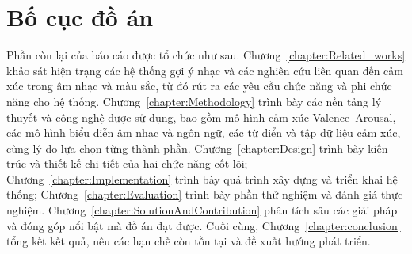 \documentclass[../DoAn.tex]{subfiles}
\begin{document}
\section{Bố cục đồ án}
\label{section:1.4}
Phần còn lại của báo cáo được tổ chức như sau. Chương~\ref{chapter:Related_works} khảo sát hiện trạng các hệ thống gợi ý nhạc và các nghiên cứu liên quan đến cảm xúc trong âm nhạc và màu sắc, từ đó rút ra các yêu cầu chức năng và phi chức năng cho hệ thống. Chương~\ref{chapter:Methodology} trình bày các nền tảng lý thuyết và công nghệ được sử dụng, bao gồm mô hình cảm xúc Valence--Arousal, các mô hình biểu diễn âm nhạc và ngôn ngữ, các từ điển và tập dữ liệu cảm xúc, cùng lý do lựa chọn từng thành phần. Chương~\ref{chapter:Design} trình bày kiến trúc và thiết kế chi tiết của hai chức năng cốt lõi; Chương~\ref{chapter:Implementation} trình bày quá trình xây dựng và triển khai hệ thống; Chương~\ref{chapter:Evaluation} trình bày phần thử nghiệm và đánh giá thực nghiệm. Chương~\ref{chapter:SolutionAndContribution} phân tích sâu các giải pháp và đóng góp nổi bật mà đồ án đạt được. Cuối cùng, Chương~\ref{chapter:conclusion} tổng kết kết quả, nêu các hạn chế còn tồn tại và đề xuất hướng phát triển.
\end{document}

